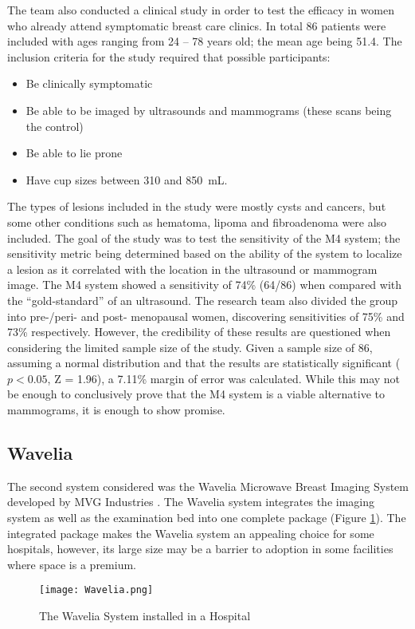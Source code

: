 The team also conducted a clinical study in order to test the efficacy in women who already attend symptomatic
breast care clinics. In total 86 patients were included with ages ranging from 24 -- 78 years old; the mean age being
51.4. The inclusion criteria for the study required that possible participants:
\begin{itemize}
    \item Be clinically symptomatic
    \item Be able to be imaged by ultrasounds and mammograms (these scans being the control)
    \item Be able to lie prone
    \item Have cup sizes between 310 and 850~mL.
\end{itemize}
The types of lesions included in the study were mostly cysts and cancers, but some other conditions such as hematoma,
lipoma and fibroadenoma were also included. The goal of the study was to test the sensitivity of the M4 system; the
sensitivity metric being determined based on the ability of the system to localize a lesion as it correlated with the
location in the ultrasound or mammogram image. The M4 system showed a sensitivity of 74\% (64/86) when compared with the
``gold-standard'' of an ultrasound. The research team also divided the group into pre-/peri- and post- menopausal women,
discovering sensitivities of 75\% and 73\% respectively. However, the credibility of these results are questioned when
considering the limited sample size of the study. Given a sample size of 86, assuming a normal distribution and that the results
are statistically significant ($p < 0.05$, Z = 1.96), a 7.11\% margin of error was calculated. While this may not be
enough to conclusively prove that the M4 system is a viable alternative to mammograms, it is enough to show promise.

\subsection{Wavelia}
The second system considered was the Wavelia Microwave Breast Imaging System developed by MVG Industries
\cite{moloneyWaveliaMicrowaveBreast2021}. The Wavelia system integrates the imaging system as well as the examination
bed into one complete package (Figure \ref{fig:WaveliaSystem}). The integrated package makes the Wavelia system an
appealing choice for some hospitals, however, its large size may be a barrier to adoption in some facilities where space
is a premium.\hfill \break
\begin{figure}[!h]
    \texttt{[image: Wavelia.png]}
    \centering
    \caption{The Wavelia System installed in a Hospital \cite{moloneyWaveliaMicrowaveBreast2021}}
    \label{fig:WaveliaSystem}
\end{figure}

